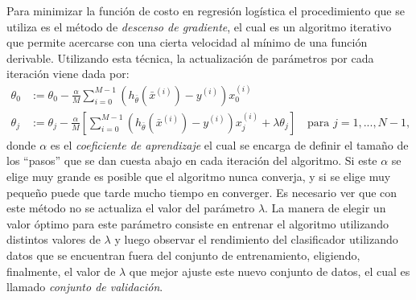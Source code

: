 Para minimizar la función de costo en regresión logística el procedimiento que se utiliza es el método de \emph{descenso de gradiente}, el cual es un algoritmo iterativo que permite acercarse con una cierta velocidad al mínimo de una función derivable. Utilizando esta técnica, la actualización de parámetros por cada iteración viene dada por:
\begin{equation}
  \begin{split}
    \theta_0 &:= \theta_0- \frac{\alpha}{M} \sum_{i=0}^{M-1}\left(h_{\bar{\theta}}(\bar{x}^{(i)})-y^{(i)}\right)x_0^{(i)}\\
    \theta_j &:= \theta_j- \frac{\alpha}{M} \left[\sum_{i=0}^{M-1} \left(h_{\bar{\theta}}(\bar{x}^{(i)})-y^{(i)}\right)x_j^{(i)}+\lambda\theta_j \right]\quad \textrm{para } j=1,...,N-1,
  \end{split}
\end{equation}
donde $\alpha$ es el \emph{coeficiente de aprendizaje} el cual se encarga de definir el tamaño de los ``pasos'' que se dan cuesta abajo en cada iteración del algoritmo. Si este $\alpha$ se elige muy grande es posible que el algoritmo nunca converja, y si se elige muy pequeño puede que tarde mucho tiempo en converger.
Es necesario ver que con este método no se actualiza el valor del parámetro $\lambda$. La manera de elegir un valor óptimo para este parámetro consiste en entrenar el algoritmo utilizando distintos valores de $\lambda$ y luego observar el rendimiento del clasificador utilizando datos que se encuentran fuera del conjunto de entrenamiento, eligiendo, finalmente, el valor de $\lambda$ que mejor ajuste este nuevo conjunto de datos, el cual es llamado \emph{conjunto de validación}.

